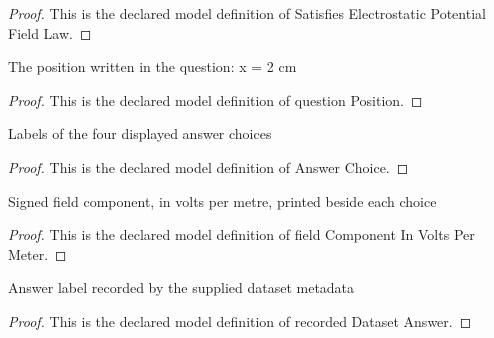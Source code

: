 \begin{proof}
  This is the declared model definition of Satisfies Electrostatic Potential Field Law.
\end{proof}
\begin{definition}
  \label{def:physics:phyx-mini-0875:phyxminiproblems-problemphyxmini0875-questionposition}
  The position written in the question: x = 2 cm
\end{definition}
\begin{proof}
  This is the declared model definition of question Position.
\end{proof}
\begin{definition}
  \label{def:physics:phyx-mini-0875:phyxminiproblems-problemphyxmini0875-answerchoice}
  Labels of the four displayed answer choices
\end{definition}
\begin{proof}
  This is the declared model definition of Answer Choice.
\end{proof}
\begin{definition}
  \label{def:physics:phyx-mini-0875:phyxminiproblems-problemphyxmini0875-answerchoice-fieldcomponentinvoltspermeter}
  Signed field component, in volts per metre, printed beside each choice
\end{definition}
\begin{proof}
  This is the declared model definition of field Component In Volts Per Meter.
\end{proof}
\begin{definition}
  \label{def:physics:phyx-mini-0875:phyxminiproblems-problemphyxmini0875-recordeddatasetanswer}
  Answer label recorded by the supplied dataset metadata
\end{definition}
\begin{proof}
  This is the declared model definition of recorded Dataset Answer.
\end{proof}
